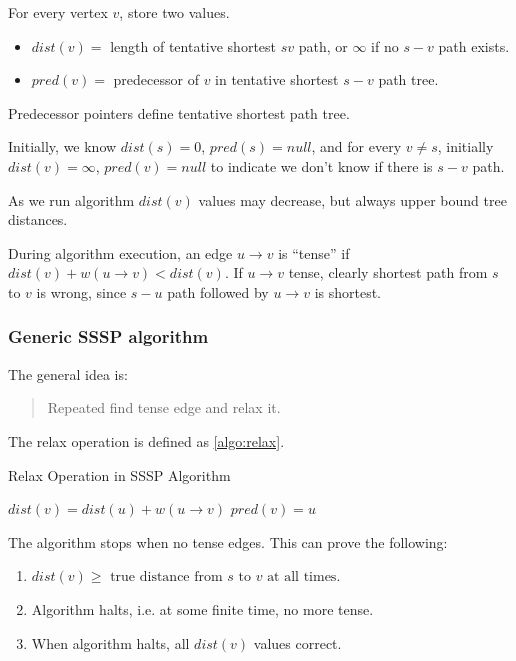 For every vertex $v$, store two values.
\begin{itemize}
    \item $dist(v) =$ length of tentative shortest $sv$ path, or $\infty$ if no $s-v$ path exists.
    \item $pred(v) =$ predecessor of $v$ in tentative shortest $s-v$ path tree.
\end{itemize}

Predecessor pointers define tentative shortest path tree.

Initially, we know $dist(s) = 0$, $pred(s) = null$,
and for every $v \neq s$, initially $dist(v) = \infty$, $pred(v) = null$
to indicate we don't know if there is $s-v$ path.

As we run algorithm $dist(v)$ values may decrease,
but always upper bound tree distances.

During algorithm execution, an edge $u \rightarrow v$ is ``tense''
if $dist(v) + w(u \rightarrow v) < dist(v)$.
If $u \rightarrow v$ tense, clearly shortest path from $s$ to $v$ is wrong,
since $s-u$ path followed by $u \rightarrow v$ is shortest.

\subsubsection{Generic SSSP algorithm}
The general idea is:
\begin{quote}
    Repeated find tense edge and relax it.
\end{quote}
The relax operation is defined as \cref{algo:relax}.

\begin{algorithm}[H]
    \caption{Relax Operation in SSSP Algorithm}\label{algo:relax}
    \begin{algorithmic}[1]
            \State $dist(v) = dist(u) + w(u \rightarrow v)$
            \State $pred(v) = u$
        \EndProcedure
    \end{algorithmic}
\end{algorithm}

The algorithm stops when no tense edges. This can prove the following:
\begin{enumerate}[label={\arabic*)}]
    \item $dist(v) \geq \text{ true distance from $s$ to $v$ at all times. }$
    \item Algorithm halts, i.e. at some finite time, no more tense.
    \item When algorithm halts, all $dist(v)$ values correct.
\end{enumerate}

